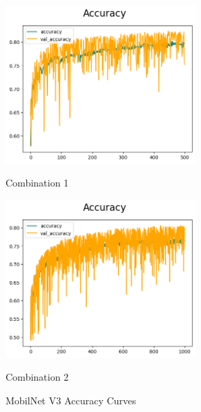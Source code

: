 \begin{figure}[H]
    \centering
    \begin{minipage}[b]{0.49\textwidth}
        \centering
        \includegraphics[width=\textwidth, height=6cm]{Figures/balanced_data/more_data/withoutbn/mn3/accuracy.png}
        \captionsetup{labelformat=empty}
        \caption{Combination 1}
        \label{fig:u_wo_r_a}
    \end{minipage}
    \hfill
    \begin{minipage}[b]{0.49\textwidth}
        \centering
        \includegraphics[width=\textwidth, height=6cm]{Figures/balanced_data/more_data/withbn/mn3/accuracy.png}
        \captionsetup{labelformat=empty}
        \caption{Combination 2}
        \label{fig:u_w_r_a}
    \end{minipage}
    \captionsetup{labelformat=default}
    \caption{MobilNet V3 Accuracy Curves}
\end{figure}


